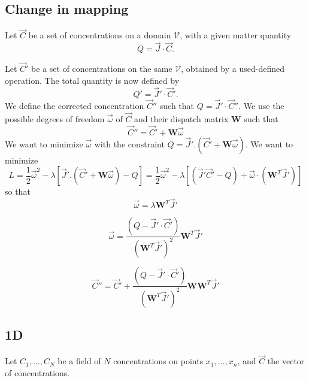 \documentclass[aps,onecolumn,11pt]{revtex4}
\begin{document}
\subsection{Change in mapping}
Let $\vec{C}$ be a set of concentrations on a domain $\mathcal{V}$,
with a given matter quantity 
$$Q=\vec{J}\cdot\vec{C}.$$

Let $\vec{C}'$ be a set of concentrations on the same $\mathcal{V}$, obtained by
a used-defined operation. The total quantity is now
defined by 
$$Q'=\vec{J}' \cdot \vec{C}'.$$
We define the corrected concentration $\vec{C}''$ such that $Q=\vec{J}'\cdot\vec{C}''$.
We use the possible degrees of freedom $\vec{\omega}$ of $\vec{C}$ and their dispatch matrix
$\bm{W}$ such that
$$
	\vec{C}'' = \vec{C}' + \bm{W} \vec{\omega}
$$
We want to minimize $\vec{\omega}$ with the constraint $Q=\vec{J}' . \left( \vec{C}' + \bm{W} \vec{\omega}\right)$.
We want to minimize
$$
	L = \dfrac{1}{2} \vec{\omega}^2 - \lambda\left[ \vec{J}' . \left( \vec{C}' + \bm{W} \vec{\omega}\right) - Q \right]
	= \dfrac{1}{2} \vec{\omega}^2 - \lambda\left[ \left(\vec{J}' \vec{C}' - Q\right) + \vec{\omega} \cdot \left( \bm{W}^T \vec{J}'\right)\right]
$$
so that
$$
	\vec{\omega} = \lambda \bm{W}^T \vec{J}'
$$

$$
	\vec{\omega} = \dfrac{\left( Q - \vec{J}' \cdot \vec{C}' \right)}{(\bm{W}^T \vec{J}')^2} \bm{W}^T \vec{J}'
$$

$$
	\vec{C}'' = \vec{C}' + \dfrac{\left( Q - \vec{J}' \cdot \vec{C}' \right)}{(\bm{W}^T \vec{J}')^2} \bm{W}\bm{W}^T \vec{J}'
$$


\subsection{1D}

\noindent Let $C_1,\ldots,C_N$ be a field of $N$ concentrations on points $x_1,\ldots,x_n$, and $\vec{C}$ the vector of concentrations.
\end{document}
